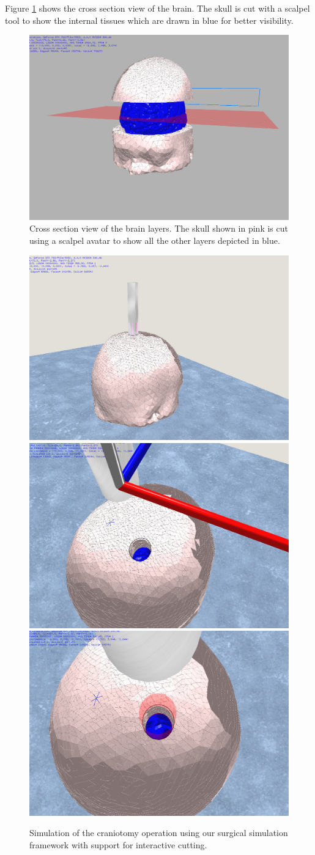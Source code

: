 Figure \ref{fig:crosssection} shows the cross section view of the brain. The skull is cut with a scalpel tool 
to show the internal tissues which are drawn in blue for better visibility. 
\begin{figure}[H]
  \centering
  \includegraphics[width=0.5\linewidth]{figures/evaluation/crosssection.png}
  \caption{\label{fig:crosssection}
  {Cross section view of the brain layers. The skull shown in pink is cut using a scalpel avatar to show 
   all the other layers depicted in blue.}
}
\end{figure}

\begin{figure}[H]
  \centering
  \includegraphics[width=0.5\linewidth]{figures/evaluation/craniotomy06.png}
  \includegraphics[width=0.5\linewidth]{figures/evaluation/craniotomy07.png}
  \includegraphics[width=0.5\linewidth]{figures/evaluation/craniotomy08.png}
  \caption{\label{fig:craniotomy}
  {Simulation of the craniotomy operation using our surgical simulation framework with support for interactive cutting.}
}
\end{figure}

